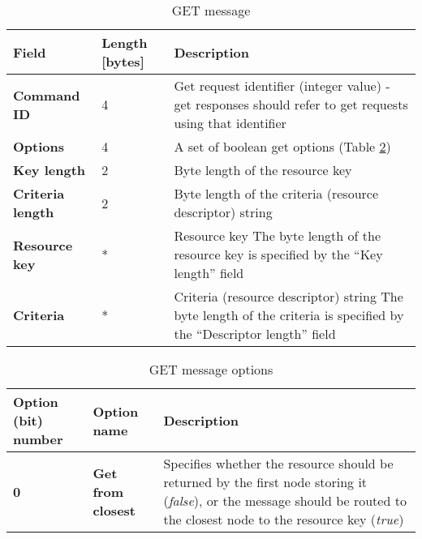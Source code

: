 \begin{table}[H]
\scriptsize
\begin{center}
\begin{tabular}{p{3cm} p{2cm} p{9.5cm}}
	\hline
	\textbf{Field}						& \textbf{Length} [bytes]				& \textbf{Description}				\\[1mm]
    \hline
    \textbf{Command ID}					& 4										& Get request identifier (integer value) - get responses should refer to get requests using that identifier					\\[1.5mm]
	\textbf{Options}					& 4										& A set of boolean get options (Table \ref{tab:mGetOptions})					\\[1.5mm]	
	\textbf{Key length}					& 2										& Byte length of the resource key					\\[1.5mm]
	\textbf{Criteria length}			& 2										& Byte length of the criteria (resource descriptor) string		\\[1.5mm]
	\textbf{Resource key}				& *										& Resource key \newline * The byte length of the resource key is specified by the ``Key length'' field										\\[1.5mm]
	\textbf{Criteria}					& *										& Criteria (resource descriptor) string \newline * The byte length of the criteria is specified by the ``Descriptor length'' field			\\[1.5mm]
    \hline
\end{tabular}
\end{center}
\caption{GET message}
\label{tab:mGet}
\end{table}

\begin{table}[H]
\scriptsize
\begin{center}
\begin{tabular}{p{2.7cm} p{2.3cm} p{9.5cm}}
	\hline
	\textbf{Option (bit) number}			& \textbf{Option name}					& \textbf{Description}				\\[1mm]
    \hline
	\textbf{0}								& \textbf{Get from closest}				& Specifies whether the resource should be returned by the first node storing it (\emph{false}), or the message should be routed to the closest node to the resource key (\emph{true})				\\[1.5mm]
    \hline
\end{tabular}
\end{center}
\caption{GET message options}
\label{tab:mGetOptions}
\end{table}



